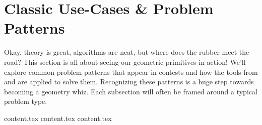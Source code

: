 \clearpage
\section{Classic Use-Cases \& Problem Patterns}
\label{sec:A.4}

Okay, theory is great, algorithms are neat, but where does the rubber meet the road? This section is all about seeing our geometric primitives in action! We'll explore common problem patterns that appear in contests and how the tools from  and  are applied to solve them. Recognizing these patterns is a huge step towards becoming a geometry whiz. Each subsection will often be framed around a typical problem type.

{content.tex}
{content.tex}
{content.tex}